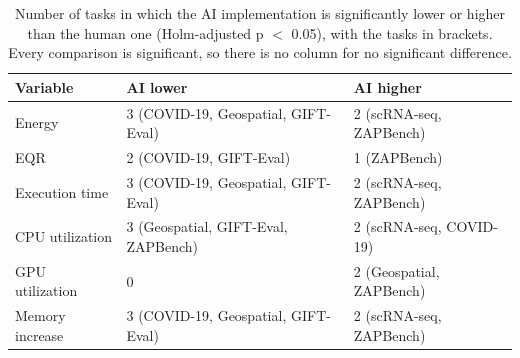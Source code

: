 \begin{table}[ht]
\centering
\caption{Number of tasks in which the AI implementation is significantly lower or higher than the human one (Holm-adjusted p $<$ 0.05), with the tasks in brackets. Every comparison is significant, so there is no column for no significant difference. } 
\label{tab:08_direction_counts}
\begingroup\small
\begin{tabular}{lll}
  \toprule
Variable & AI lower & AI higher \\ 
  \midrule
Energy & 3 (COVID-19, Geospatial, GIFT-Eval) & 2 (scRNA-seq, ZAPBench) \\ 
  EQR & 2 (COVID-19, GIFT-Eval) & 1 (ZAPBench) \\ 
  Execution time & 3 (COVID-19, Geospatial, GIFT-Eval) & 2 (scRNA-seq, ZAPBench) \\ 
  CPU utilization & 3 (Geospatial, GIFT-Eval, ZAPBench) & 2 (scRNA-seq, COVID-19) \\ 
  GPU utilization & 0 & 2 (Geospatial, ZAPBench) \\ 
  Memory increase & 3 (COVID-19, Geospatial, GIFT-Eval) & 2 (scRNA-seq, ZAPBench) \\ 
   \bottomrule
\end{tabular}
\endgroup
\end{table}
